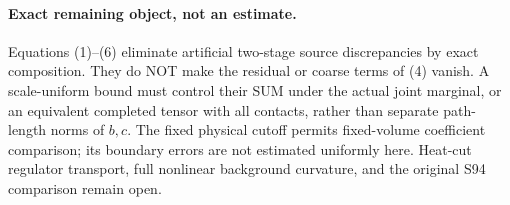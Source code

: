 \documentclass[11pt]{article}
\begin{document}
\paragraph{Exact remaining object, not an estimate.}
Equations (1)--(6) eliminate artificial two-stage source discrepancies
by exact composition. They do NOT make the residual or coarse terms
of (4) vanish. A scale-uniform bound must control their SUM under
the actual joint marginal, or an equivalent completed tensor with
all contacts, rather than separate path-length norms of $b,c$.
The fixed physical cutoff permits fixed-volume coefficient comparison;
its boundary errors are not estimated uniformly here. Heat-cut
regulator transport, full nonlinear background curvature, and the
original S94 comparison remain open.
\end{document}
